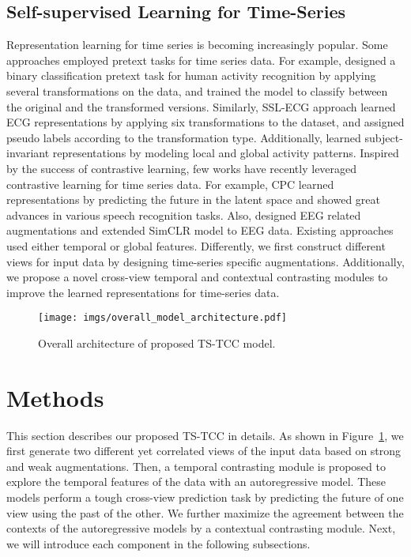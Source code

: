 \documentclass{article}
\begin{document}
\subsection{Self-supervised Learning for Time-Series}
Representation learning for time series is becoming increasingly popular. Some approaches employed pretext tasks for time series data. For example, \cite{SSL_har} designed a binary classification pretext task for human activity recognition by applying several transformations on the data, and trained the model to classify between the original and the transformed versions. Similarly, SSL-ECG approach \cite{ecg_emotion_rec} learned ECG representations by applying six transformations to the dataset, and assigned pseudo labels according to the transformation type. 
Additionally, \cite{aggarwal2019adversarial} learned subject-invariant representations by modeling local and global activity patterns. Inspired by the success of contrastive learning, few works have recently leveraged contrastive learning for time series data. For example, CPC \cite{oord2018representation} learned representations by predicting the future in the latent space and showed great advances in various speech recognition tasks. Also, \cite{mohsenvand20a} designed EEG related augmentations and extended SimCLR model \cite{chen2020simple} to EEG data. Existing approaches used either temporal or global features. Differently, we first construct different views for input data by designing time-series specific augmentations. Additionally, we propose a novel cross-view temporal and contextual contrasting modules to improve the learned representations for time-series data.


\begin{figure}
\centering
\texttt{[image: imgs/overall\_model\_architecture.pdf]}
\caption{Overall architecture of proposed TS-TCC model.}
\label{Fig:overall}
\end{figure}



\section{Methods}

This section describes our proposed TS-TCC in details. As shown in Figure~\ref{Fig:overall}, we first generate two different yet correlated views of the input data based on strong and weak augmentations. Then, a temporal contrasting module is proposed to explore the temporal features of the data with an autoregressive model. These models perform a tough cross-view prediction task by predicting the future of one view using the past of the other. We further maximize the agreement between the contexts of the autoregressive models by a contextual contrasting module. Next, we will introduce each component in the following subsections.
\end{document}
